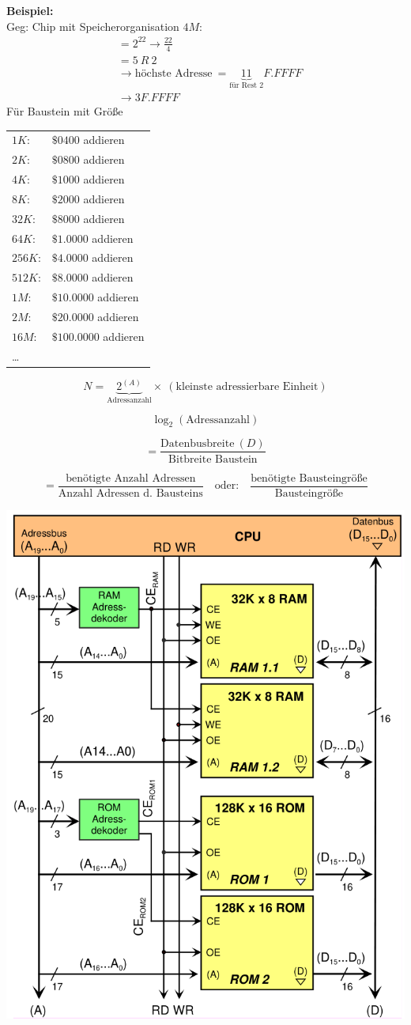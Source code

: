 \documentclass[a5paper,12pt,twoside]{scrartcl}
\begin{document}
\textbf{Beispiel:}\\
Geg: Chip mit Speicherorganisation \(4M\):
\begin{align*}
  &= 2^{22} \rightarrow \frac{22}{4}\\
  &= 5\ R\ 2\\
  &\rightarrow \text{höchste Adresse}\ = \underbrace{11}_{\text{für Rest 2}}F.FFFF\\
  &\rightarrow 3F.FFFF
\end{align*}
 Für Baustein mit Größe\\[1em]
\begin{tabular}{ll}
  \(1K\): & \(\$0400\) addieren\\
  \(2K\): & \(\$0800\) addieren\\
  \(4K\): & \(\$1000\) addieren\\
  \(8K\): & \(\$2000\) addieren\\
  \(32K\): & \(\$8000\) addieren\\
  \(64K\): & \(\$1.0000\) addieren\\
  \(256K\): & \(\$4.0000\) addieren\\
  \(512K\): & \(\$8.0000\) addieren\\
  \(1M\): & \(\$10.0000\) addieren\\
  \(2M\): & \(\$20.0000\) addieren\\
  \(16M\): & \(\$100.0000\) addieren\\
  \ldots&\\
\end{tabular}

\[N = \underbrace{2^{(A)}}_{\text{Adressanzahl}} \times\ (\text{kleinste adressierbare Einheit})\]

\[\log_2\left(\text{Adressanzahl}\right)\]

\[= \frac{\text{Datenbusbreite}\ (D)}{\text{Bitbreite Baustein}}\]

\[= \frac{\text{benötigte Anzahl Adressen}}{\text{Anzahl Adressen d. Bausteins}}\quad\text{oder:}\quad\frac{\text{benötigte Bausteingröße}}{\text{Bausteingröße}}\]



{\centering%
  \includegraphics[width=.5\textwidth]{SpeicherAufbau}
  \par%
}
\end{document}
